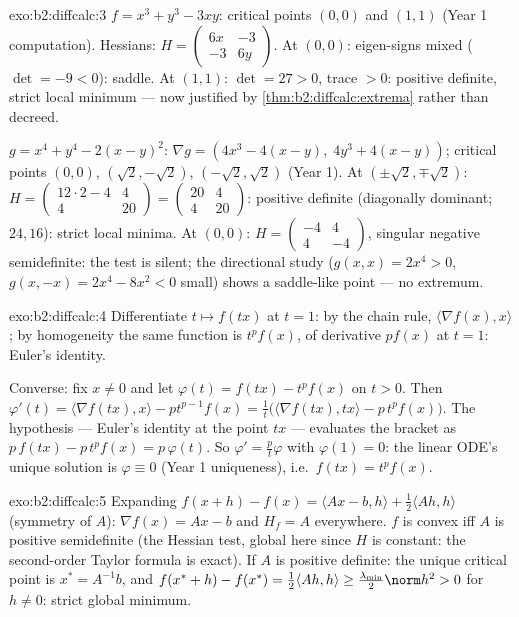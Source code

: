 \begin{solution}{exo:b2:diffcalc:3}
$f = x^3 + y^3 - 3xy$: critical points $(0,0)$ and $(1,1)$ (Year 1
computation). Hessians: $H = \begin{pmatrix} 6x & -3\\ -3 &
6y\end{pmatrix}$. At $(0,0)$: eigen-signs mixed ($\det = -9 < 0$):
saddle. At $(1,1)$: $\det = 27 > 0$, trace $> 0$: positive
definite, strict local minimum --- now justified by
\cref{thm:b2:diffcalc:extrema} rather than decreed.

$g = x^4 + y^4 - 2(x-y)^2$: $\nabla g = (4x^3 - 4(x - y),\; 4y^3 +
4(x-y))$; critical points $(0,0)$, $(\sqrt2, -\sqrt2)$,
$(-\sqrt2, \sqrt2)$ (Year 1). At $(\pm\sqrt2, \mp\sqrt2)$: $H =
\begin{pmatrix} 12\cdot2 - 4 & 4\\ 4 & 20\end{pmatrix} =
\begin{pmatrix} 20 & 4\\ 4 & 20\end{pmatrix}$: positive definite
(diagonally dominant;  $24, 16$): strict local minima.
At $(0,0)$: $H = \begin{pmatrix} -4 & 4\\ 4 & -4\end{pmatrix}$,
singular negative semidefinite: the test is silent; the directional
study ($g(x,x) = 2x^4 > 0$, $g(x,-x) = 2x^4 - 8x^2 < 0$ small)
shows a saddle-like point --- no extremum.
\end{solution}

\begin{solution}{exo:b2:diffcalc:4}
Differentiate $t \mapsto f(tx)$ at $t = 1$: by the chain rule,
$\langle \nabla f(x), x\rangle$; by homogeneity the same function
is $t^pf(x)$, of derivative $pf(x)$ at $t = 1$: Euler's identity.

Converse: fix $x \neq 0$ and let $\varphi(t) = f(tx) - t^p f(x)$
on $t > 0$. Then $\varphi'(t) = \langle\nabla f(tx), x\rangle -
pt^{p-1}f(x) = \frac1t\bigl(\langle \nabla f(tx), tx\rangle -
p\,t^pf(x)\bigr)$. The hypothesis --- Euler's identity at the point
$tx$ --- evaluates the bracket as $p\,f(tx) - p\,t^pf(x) =
p\,\varphi(t)$. So $\varphi' = \frac{p}{t}\varphi$ with $\varphi(1)
= 0$: the linear ODE's unique solution is $\varphi \equiv 0$ (Year
1 uniqueness), i.e.\ $f(tx) = t^pf(x)$.
\end{solution}

\begin{solution}{exo:b2:diffcalc:5}
Expanding $f(x + h) - f(x) = \langle Ax - b, h\rangle +
\frac12\langle Ah, h\rangle$ (symmetry of $A$): $\nabla f(x) = Ax -
b$ and $H_f = A$ everywhere. $f$ is convex iff $A$ is positive
semidefinite (the Hessian test, global here since $H$ is constant:
the second-order Taylor formula is exact). If $A$ is positive
definite: the unique critical point is $x^* = A^{-1}b$, and $f(x^*
+ h) - f(x^*) = \frac12\langle Ah, h\rangle \geq
\frac{\lambda_{\min}}{2}\norm h^2 > 0$ for $h \neq 0$: strict
global minimum.
\end{solution}


